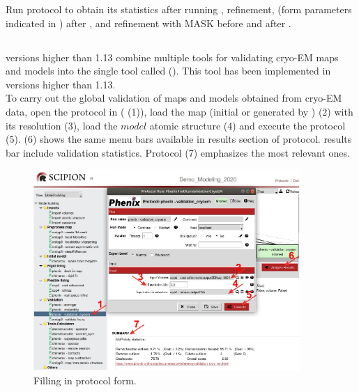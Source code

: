   Run \molprobity protocol to obtain its statistics after running \chimera {}, \coot refinement, \phenix {} (form parameters indicated in ) after \coot, and  refinement with MASK before and after \phenix {}. 
  
  \subsection*{\validationCryoEM}
  
  \phenix versions higher than 1.13 combine multiple tools for validating cryo-EM maps and models into the single tool called \validationCryoEM (\citep{afonine2018b}). This tool has been implemented in \phenix versions higher than 1.13.\\
  
  To carry out the global validation of maps and models obtained from cryo-EM data, open the protocol  in \scipion ( (1)), load the map (initial or generated by \coot) (2) with its resolution (3), load the $model$ atomic structure (4) and execute the protocol (5).  (6) shows the same menu bars available in results section of \phenix {} protocol. \molprobity results bar include validation statistics. Protocol  (7) emphasizes the most relevant ones.\\
  
  \begin{figure}[H]
    \centering 
    \captionsetup{width=.7\linewidth} 
    \includegraphics[width=0.90\textwidth]{Images/Fig60}
    \caption{Filling in \phenix \validationCryoEM protocol form.}
    \label{fig:validationCryoEM_protocol}
    \end{figure}
  
